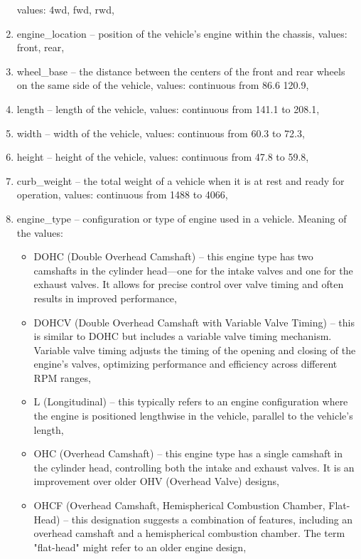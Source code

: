\documentclass[11pt,a4paper]{article}\usepackage[]{graphicx}\usepackage[]{xcolor}
\begin{document}
\begin{enumerate}
\begin{itemize}
  \end{itemize}
  values: 4wd, fwd, rwd,
  \item engine\_location -- position of the vehicle's engine within the chassis, values: front, rear,
 \item wheel\_base --  the distance between the centers of the front and rear wheels on the same side of the vehicle, values: continuous from 86.6 120.9,
 \item length -- length of the vehicle, values: continuous from 141.1 to 208.1,
 \item width -- width of the vehicle, values: continuous from 60.3 to 72.3,
 \item height -- height of the vehicle, values:  continuous from 47.8 to 59.8,
 \item curb\_weight -- the total weight of a vehicle when it is at rest and ready for operation, values: continuous from 1488 to 4066,
 \item engine\_type -- configuration or type of engine used in a vehicle. Meaning of the values:
 \begin{itemize}
 \item DOHC (Double Overhead Camshaft) -- this engine type has two camshafts in the cylinder head—one for the intake valves and one for the exhaust valves. It allows for precise control over valve timing and often results in improved performance,

\item DOHCV (Double Overhead Camshaft with Variable Valve Timing) -- this is similar to DOHC but includes a variable valve timing mechanism. Variable valve timing adjusts the timing of the opening and closing of the engine's valves, optimizing performance and efficiency across different RPM ranges,

\item L (Longitudinal) -- this typically refers to an engine configuration where the engine is positioned lengthwise in the vehicle, parallel to the vehicle's length,

\item OHC (Overhead Camshaft) -- this engine type has a single camshaft in the cylinder head, controlling both the intake and exhaust valves. It is an improvement over older OHV (Overhead Valve) designs,

\item OHCF (Overhead Camshaft, Hemispherical Combustion Chamber, Flat-Head) -- this designation suggests a combination of features, including an overhead camshaft and a hemispherical combustion chamber. The term "flat-head" might refer to an older engine design,


\end{itemize}
\end{enumerate}
\end{document}
